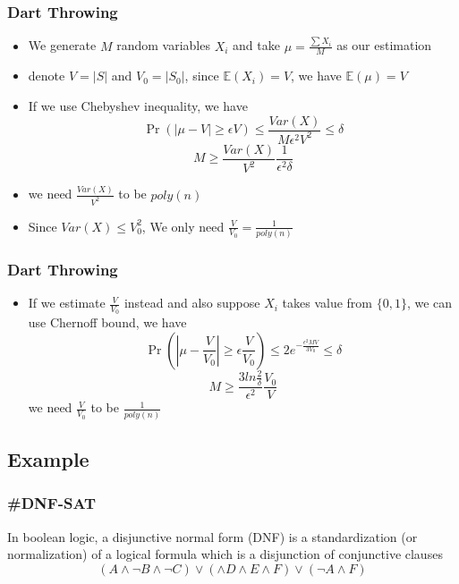 \documentclass[table, usenames,dvipsnames,svgnames]{beamer}
\begin{document}
\begin{frame}
    \frametitle{Dart Throwing}
    \pause
    \begin{itemize}
        \item We generate $M$ random variables $X_i$ and take $\mu = \frac{\sum{X_i}}{M}$ as our estimation \pause
        \item denote $V = |S|$ and $V_0 = |S_0|$, since $\mathbb{E}(X_i) = V$, we have $\mathbb{E}(\mu) = V$ \pause
        \item If we use Chebyshev inequality, we have
            $$
            \Pr(|\mu - V| \geq \epsilon V) \leq \frac{Var(X)}{M\epsilon ^ 2 V ^ 2} \leq \delta
            $$
            $$
            M \geq \frac{Var(X)}{V ^ 2}\frac{1}{\epsilon ^ 2 \delta}
            $$\pause
            \item we need $\frac{Var(X)}{V^2}$ to be $poly(n)$\pause
            \item Since $Var(X) \leq V_0^2$, We only need $\frac{V}{V_0} = \frac{1}{poly(n)}$ 
    \end{itemize}
\end{frame}

\begin{frame}
    \frametitle{Dart Throwing}
    \pause
    \begin{itemize}
        \item If we estimate $\frac{V}{V_0}$ instead and also suppose $X_i$ takes value from $\{0, 1\}$, we can use Chernoff bound, we have
            $$
            \Pr(|\mu - \frac{V}{V_0}| \geq \epsilon \frac{V}{V_0}) \leq 2e^{-\frac{\epsilon ^ 2 MV}{3V_0}} \leq \delta
            $$
            $$
            M \geq \frac{3ln\frac{2}{\delta}}{\epsilon ^ 2}\frac{V_0}{V}
            $$\pause
            we need $\frac{V}{V_0}$ to be $\frac{1}{poly(n)}$
    \end{itemize}
\end{frame}

\subsection{Example}

\begin{frame}
    \frametitle{\#DNF-SAT}
    \pause
    \begin{definition}[DNF]
        In boolean logic, a disjunctive normal form (DNF) is a standardization (or normalization) of a logical formula which is a disjunction of conjunctive clauses
        $$
        (A \wedge \neg B \wedge \neg C) \vee (\wedge D \wedge E \wedge F) \vee (\neg A \wedge F)
        $$
    \end{definition}
\end{frame}
\end{document}

